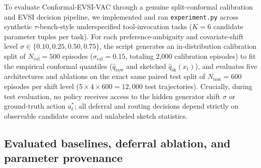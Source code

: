 \documentclass[11pt]{article}
\begin{document}
To evaluate Conformal-EVSI-VAC through a genuine split-conformal calibration and EVSI decision pipeline, we implemented and ran \texttt{experiment.\linebreak[0]py} across synthetic $\tau$-bench-style underspecified tool-invocation tasks ($K=6$ candidate parameter tuples per task). For each preference-ambiguity and covariate-shift level $\sigma \in \{0.10,\allowbreak 0.25,\allowbreak 0.50,\allowbreak 0.75\}$, the script generates an in-distribution calibration split of $N_{\mathrm{cal}} = 500$ episodes ($\sigma_{\mathrm{cal}} = 0.15$, totaling 2{,}000 calibration episodes) to fit the empirical conformal quantiles ($\hat{q}_{\mathrm{raw}}$ and sketched $\hat{q}_{\mathrm{sk}}(x_t)$), and evaluates five architectures and ablations on the exact same paired test split of $N_{\mathrm{test}} = 600$ episodes per shift level ($5 \times 4 \times 600 = 12{,}000$ test trajectories). Crucially, during test evaluation, no policy receives access to the hidden generator shift $\sigma$ or ground-truth action $a_t^*$; all deferral and routing decisions depend strictly on observable candidate scores and unlabeled sketch statistics.

\subsection{Evaluated baselines, deferral ablation, and parameter provenance}
\end{document}
